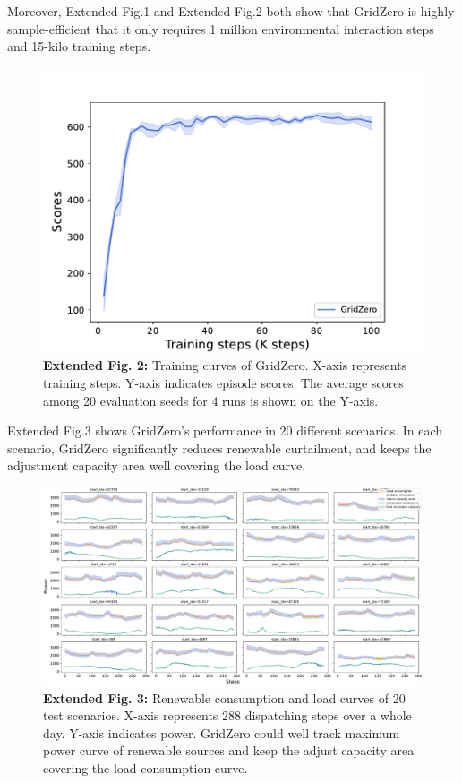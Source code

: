 Moreover, Extended Fig.1 and Extended Fig.2 both show that GridZero is highly sample-efficient that it only requires 1 million environmental interaction steps and 15-kilo training steps.
\begin{figure}[h]
    \centering
    \includegraphics[width=0.6\linewidth]{fig/perfmance_trainsteps.pdf}
    \captionsetup{labelformat=empty}
    \caption{\textbf{Extended Fig. 2:} Training curves of GridZero. X-axis represents training steps. Y-axis indicates episode scores. The average scores among 20 evaluation seeds for 4 runs is shown on the Y-axis.}
    \label{fig:perf_training}
\end{figure}

Extended Fig.3 shows GridZero's performance in 20 different scenarios. In each scenario, GridZero significantly reduces renewable curtailment, and keeps the adjustment capacity area well covering the load curve.
\begin{figure}[h]
  \centering
  \includegraphics[width=1.0\linewidth]{fig/20_episodes.pdf}
  \captionsetup{labelformat=empty}
  \caption{\textbf{Extended Fig. 3:} Renewable consumption and load curves of 20 test scenarios. X-axis represents 288 dispatching steps over a whole day. Y-axis indicates power. GridZero could well track maximum power curve of renewable sources and keep the adjust capacity area covering the load consumption curve. 
  } 
  \label{fig:20_episodes}
\end{figure}

